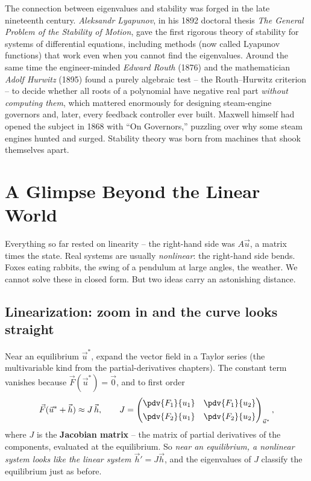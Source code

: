 \begin{historybox}
The connection between eigenvalues and stability was forged in the late
nineteenth century. \emph{Aleksandr Lyapunov}, in his 1892 doctoral thesis
\emph{The General Problem of the Stability of Motion}, gave the first rigorous
theory of stability for systems of differential equations, including methods
(now called Lyapunov functions) that work even when you cannot find the
eigenvalues. Around the same time the engineer-minded \emph{Edward Routh} (1876)
and the mathematician \emph{Adolf Hurwitz} (1895) found a purely algebraic test
-- the Routh--Hurwitz criterion -- to decide whether all roots of a polynomial
have negative real part \emph{without computing them}, which mattered enormously
for designing steam-engine governors and, later, every feedback controller ever
built. Maxwell himself had opened the subject in 1868 with ``On Governors,''
puzzling over why some steam engines hunted and surged. Stability theory was born
from machines that shook themselves apart.
\end{historybox}

\section{A Glimpse Beyond the Linear World}
\label{ch39:nonlinear}

Everything so far rested on linearity -- the right-hand side was $A\vec u$, a
matrix times the state. Real systems are usually \emph{nonlinear}: the
right-hand side bends. Foxes eating rabbits, the swing of a pendulum at large
angles, the weather. We cannot solve these in closed form. But two ideas carry an
astonishing distance.

\subsection{Linearization: zoom in and the curve looks straight}

Near an equilibrium $\vec u^{*}$, expand the vector field in a Taylor series (the
multivariable kind from the partial-derivatives chapters). The constant term
vanishes because $\vec F(\vec u^{*})=\vec 0$, and to first order
\[
  \vec F(\vec u^{*} + \vec h) \approx J\,\vec h,
  \qquad
  J = \begin{pmatrix}
    \pdv{F_1}{u_1} & \pdv{F_1}{u_2} \\[4pt]
    \pdv{F_2}{u_1} & \pdv{F_2}{u_2}
  \end{pmatrix}_{\vec u^{*}},
\]
where $J$ is the \textbf{Jacobian matrix} -- the matrix of partial derivatives of
the components, evaluated at the equilibrium. So \emph{near an equilibrium, a
nonlinear system looks like the linear system $\vec h' = J\vec h$}, and the
eigenvalues of $J$ classify the equilibrium just as before.

